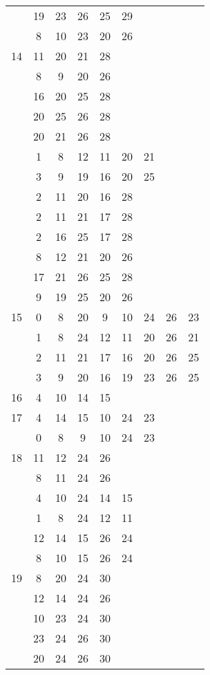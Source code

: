 \begin{table}[H]
\begin{tabular}{|c|cccccccc|}
 & 19 & 23 & 26 & 25 & 29 &   &   &  \\
 & 8 & 10 & 23 & 20 & 26 &   &   &  \\
\hline
14  & 11 & 20 & 21 & 28 &   &   &   &  \\
 & 8 & 9 & 20 & 26 &   &   &   &  \\
 & 16 & 20 & 25 & 28 &   &   &   &  \\
 & 20 & 25 & 26 & 28 &   &   &   &  \\
 & 20 & 21 & 26 & 28 &   &   &   &  \\
 & 1 & 8 & 12 & 11 & 20 & 21 &   &  \\
 & 3 & 9 & 19 & 16 & 20 & 25 &   &  \\
 & 2 & 11 & 20 & 16 & 28 &   &   &  \\
 & 2 & 11 & 21 & 17 & 28 &   &   &  \\
 & 2 & 16 & 25 & 17 & 28 &   &   &  \\
 & 8 & 12 & 21 & 20 & 26 &   &   &  \\
 & 17 & 21 & 26 & 25 & 28 &   &   &  \\
 & 9 & 19 & 25 & 20 & 26 &   &   &  \\
\hline
15  & 0 & 8 & 20 & 9 & 10 & 24 & 26 & 23\\
 & 1 & 8 & 24 & 12 & 11 & 20 & 26 & 21\\
 & 2 & 11 & 21 & 17 & 16 & 20 & 26 & 25\\
 & 3 & 9 & 20 & 16 & 19 & 23 & 26 & 25\\
\hline
16  & 4 & 10 & 14 & 15 &   &   &   &  \\
\hline
17  & 4 & 14 & 15 & 10 & 24 & 23 &   &  \\
 & 0 & 8 & 9 & 10 & 24 & 23 &   &  \\
\hline
18  & 11 & 12 & 24 & 26 &   &   &   &  \\
 & 8 & 11 & 24 & 26 &   &   &   &  \\
 & 4 & 10 & 24 & 14 & 15 &   &   &  \\
 & 1 & 8 & 24 & 12 & 11 &   &   &  \\
 & 12 & 14 & 15 & 26 & 24 &   &   &  \\
 & 8 & 10 & 15 & 26 & 24 &   &   &  \\
\hline
19  & 8 & 20 & 24 & 30 &   &   &   &  \\
 & 12 & 14 & 24 & 26 &   &   &   &  \\
 & 10 & 23 & 24 & 30 &   &   &   &  \\
 & 23 & 24 & 26 & 30 &   &   &   &  \\
 & 20 & 24 & 26 & 30 &   &   &   &  \\

\end{tabular}
\end{table}
